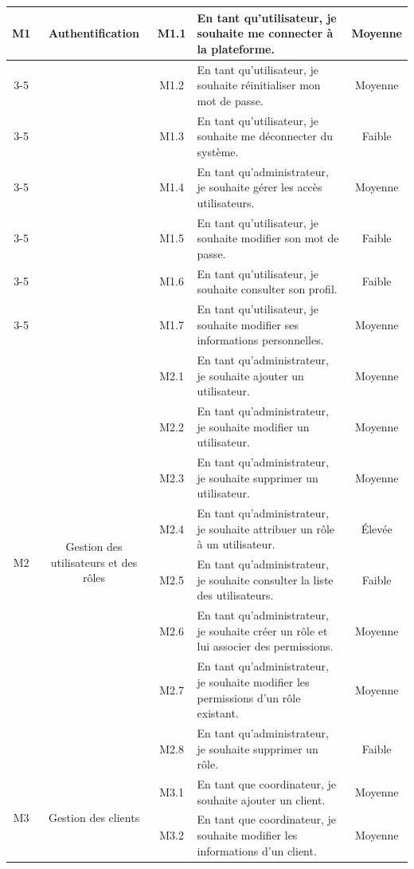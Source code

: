 \begin{longtable}{|c|c|c|p{7.2cm}|c|}
\multirow{7}{*}{M1} & \multirow{7}{*}{Authentification} & M1.1 & En tant qu'utilisateur, je souhaite me connecter à la plateforme. & Moyenne \\
\cline{3-5}
 & & M1.2 & En tant qu'utilisateur, je souhaite réinitialiser mon mot de passe. & Moyenne \\
\cline{3-5}
 & & M1.3 & En tant qu'utilisateur, je souhaite me déconnecter du système. & Faible \\
\cline{3-5}
 & & M1.4 & En tant qu'administrateur, je souhaite gérer les accès utilisateurs. & Moyenne \\
\cline{3-5}
 & & M1.5 & En tant qu'utilisateur, je souhaite modifier son mot de passe. & Faible \\
\cline{3-5}
 & & M1.6 & En tant qu'utilisateur, je souhaite consulter son profil. & Faible \\
\cline{3-5}
 & & M1.7 & En tant qu'utilisateur, je souhaite modifier ses informations personnelles. & Moyenne \\
\hline
\multirow{8}{*}{M2} & \multirow{8}{*}{Gestion des utilisateurs et des rôles} & M2.1 & En tant qu'administrateur, je souhaite ajouter un utilisateur. & Moyenne \\
\cline{3-5}
 & & M2.2 & En tant qu'administrateur, je souhaite modifier un utilisateur. & Moyenne \\
\cline{3-5}
 & & M2.3 & En tant qu'administrateur, je souhaite supprimer un utilisateur. & Moyenne \\
\cline{3-5}
 & & M2.4 & En tant qu'administrateur, je souhaite attribuer un rôle à un utilisateur. & Élevée \\
\cline{3-5}
 & & M2.5 & En tant qu'administrateur, je souhaite consulter la liste des utilisateurs. & Faible \\
\cline{3-5}
 & & M2.6 & En tant qu'administrateur, je souhaite créer un rôle et lui associer des permissions. & Moyenne \\
\cline{3-5}
 & & M2.7 & En tant qu'administrateur, je souhaite modifier les permissions d'un rôle existant. & Moyenne \\
\cline{3-5}
 & & M2.8 & En tant qu'administrateur, je souhaite supprimer un rôle. & Faible \\
\hline
\multirow{8}{*}{M3} & \multirow{8}{*}{Gestion des clients} & M3.1 & En tant que coordinateur, je souhaite ajouter un client. & Moyenne \\
\cline{3-5}
 & & M3.2 & En tant que coordinateur, je souhaite modifier les informations d'un client. & Moyenne \\

\end{longtable}
